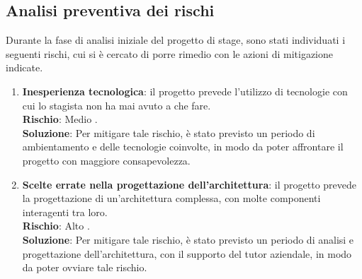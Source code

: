 \subsection{Analisi preventiva dei rischi}
Durante la fase di analisi iniziale del progetto di stage, sono stati individuati i seguenti rischi, cui si è cercato di porre rimedio con le azioni di mitigazione indicate. \\
\begin{enumerate}
    \item \textbf{Inesperienza tecnologica}: il progetto prevede l'utilizzo di tecnologie con cui lo stagista non ha mai avuto a che fare. \\
    \textbf{Rischio}: Medio .\\
    \textbf{Soluzione}: Per mitigare tale rischio, è stato previsto un periodo di ambientamento e delle tecnologie coinvolte, in modo da poter affrontare il progetto con maggiore consapevolezza.
    \item \textbf{Scelte errate nella progettazione dell'architettura}: il progetto prevede la progettazione di un'architettura complessa, con molte componenti interagenti tra loro. \\
    \textbf{Rischio}: Alto .\\
    \textbf{Soluzione}: Per mitigare tale rischio, è stato previsto un periodo di analisi e progettazione dell'architettura, con il supporto del tutor aziendale, in modo da poter ovviare tale rischio.

\end{enumerate}    
\newpage
\pagestyle{empty}
\null %

\newpage